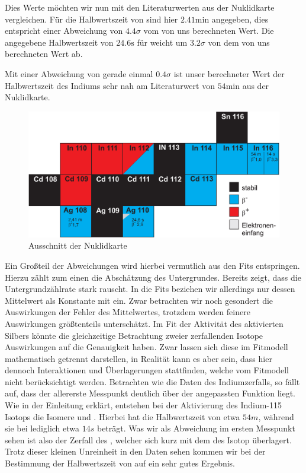 Dies Werte möchten wir nun mit den Literaturwerten aus der Nuklidkarte  vergleichen. Für die Halbwertszeit von  sind hier $2.41\si{\minute}$ angegeben, dies entspricht einer Abweichung von $4.4\sigma$ vom von uns berechneten Wert. Die angegebene Halbwertszeit von $24.6\si{\second}$ für  weicht um $3.2\sigma$ von dem von uns berechneten Wert ab.

Mit einer Abweichung von gerade einmal $0.4\sigma$ ist unser berechneter Wert der Halbwertszeit des Indiums sehr nah am Literaturwert von $54 \si{\minute}$ aus der Nuklidkarte.

\begin{figure}[H]
    \centering
    \includegraphics[width=.85\textwidth]{files/nuklidkarte.png}
    \caption{Ausschnitt der Nuklidkarte}
    \label{plot:nuklidkarte}
\end{figure}

Ein Großteil der Abweichungen wird hierbei vermutlich aus den Fits entspringen. Hierzu zählt zum einen die Abschätzung des Untergrundes. Bereits  zeigt, dass die Untergrundzählrate stark rauscht. In die Fits beziehen wir allerdings nur dessen Mittelwert als Konstante mit ein. Zwar betrachten wir noch gesondert die Auswirkungen der Fehler des Mittelwertes, trotzdem werden feinere Auswirkungen größtenteils unterschätzt.\newline\noindent
Im Fit der Aktivität des aktivierten Silbers könnte die gleichzeitige Betrachtung zweier zerfallenden Isotope Auswirkungen auf die Genauigkeit haben. Zwar lassen sich diese im Fitmodell mathematisch getrennt darstellen, in Realität kann es aber sein, dass hier dennoch Interaktionen und Überlagerungen stattfinden, welche vom Fitmodell nicht berücksichtigt werden. Betrachten wie die Daten des Indiumzerfalls, so fällt auf, dass der allererste Messpunkt deutlich über der angepassten Funktion liegt.\newline\noindent
Wie in der Einleitung erklärt, entstehen bei der Aktivierung des Indium-115 Isotops die Isomere  und . Hierbei hat  die Halbwertszeit von etwa $54 \unit{m}$, während sie bei  lediglich etwa $14\unit{s}$ beträgt. Was wir als Abweichung im ersten Messpunkt sehen ist also der Zerfall des , welcher sich kurz mit dem des  Isotop überlagert. Trotz dieser kleinen Unreinheit in den Daten sehen kommen wir bei der Bestimmung der Halbwertszeit von  auf ein sehr gutes Ergebnis.